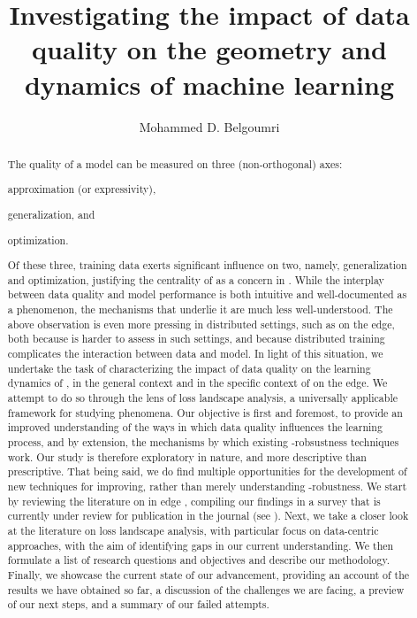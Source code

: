 \documentclass[12pt]{report}
\title{Investigating the impact of data quality on the geometry and dynamics of machine learning}
\author{Mohammed D. Belgoumri}
\begin{document}


\begin{abstract}
	\thispagestyle{plain}
	The quality of a  model can be measured on three (non-orthogonal) axes:
	\begin{enumerate*}[label=(\arabic*)]
		\item approximation (or expressivity),
		\item generalization, and
		\item optimization.
	\end{enumerate*}
	Of these three, training data exerts significant influence on two,
	namely, generalization and optimization,
	justifying the centrality of  as a concern in .
	While the interplay between data quality and model performance
	is both intuitive and well-documented as a phenomenon, the
	mechanisms that underlie it are much less well-understood.
	The above observation is even more pressing in distributed settings,
	such as  on the edge,
	both because  is harder to assess in such settings,
	and because distributed training complicates the interaction between data and model.
	In light of this situation, we undertake the task of characterizing the impact of data quality
	on the learning dynamics of ,
	in the general context and in the specific context of  on the edge.
	We attempt to do so through the lens of loss landscape analysis,
	a universally applicable framework for studying  phenomena.
	Our objective is first and foremost, to provide an improved understanding
	of the ways in which data quality influences the learning process, and by extension,
	the mechanisms by which existing -robsustness techniques work.
	Our study is therefore exploratory in nature, and more descriptive than prescriptive.
	That being said, we do find multiple opportunities for the development of new techniques
	for improving, rather than merely understanding -robustness.
	We start by reviewing the literature on  in edge ,
	compiling our findings in a survey that is currently under review
	for publication in the  journal (see ).
	Next, we take a closer look at the literature on loss landscape analysis,
	with particular focus on data-centric approaches,
	with the aim of identifying gaps in our current understanding.
	We then formulate a list of research questions and objectives and describe our methodology.
	Finally, we showcase the current state of our advancement,
	providing an account of the results we have obtained so far,
	a discussion of the challenges we are facing,
	a preview of our next steps,
	and a summary of our failed attempts.
\end{abstract}
\setcounter{page}{2}
\tableofcontents
\newpage
\listoffigures
\listoftables
\end{document}

